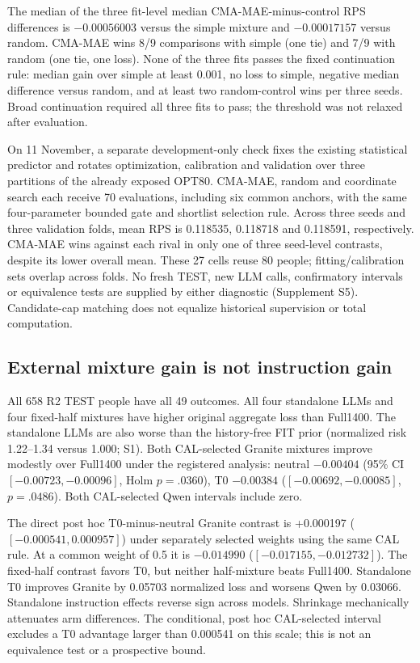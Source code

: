 \documentclass[11pt]{article}
\begin{document}
The median of the three fit-level median CMA-MAE-minus-control RPS
differences is $-0.00056003$ versus the simple mixture and $-0.00017157$
versus random. CMA-MAE wins 8/9 comparisons with simple (one tie) and
7/9 with random (one tie, one loss). None of the three fits passes the
fixed continuation rule: median gain over simple at least 0.001, no loss
to simple, negative median difference versus random, and at least two
random-control wins per three seeds. Broad continuation required all three
fits to pass; the threshold was not relaxed after evaluation.

On 11 November, a separate development-only check fixes the existing
statistical predictor and rotates optimization, calibration and validation
over three partitions of the already exposed OPT80. CMA-MAE, random and
coordinate search each receive 70 evaluations, including six common anchors,
with the same four-parameter bounded gate and shortlist selection rule.
Across three seeds and three validation folds, mean RPS is 0.118535,
0.118718 and 0.118591, respectively. CMA-MAE wins against each rival in
only one of three seed-level contrasts, despite its lower overall mean.
These 27 cells reuse 80 people; fitting/calibration sets overlap across folds.
No fresh TEST, new LLM calls, confirmatory intervals or equivalence tests
are supplied by either diagnostic (Supplement S5). Candidate-cap matching
does not equalize historical supervision or total computation.

\subsection{External mixture gain is not instruction gain}
All 658 R2 TEST people have all 49 outcomes. All four standalone LLMs and four fixed-half mixtures have higher original aggregate loss than Full1400. The standalone LLMs are also worse than the history-free FIT prior (normalized risk 1.22--1.34 versus 1.000; S1). Both CAL-selected Granite mixtures improve modestly over Full1400 under the registered analysis: neutral $-0.00404$ (95\% CI $[-0.00723,-0.00096]$, Holm $p=.0360$), T0 $-0.00384$ ($[-0.00692,-0.00085]$, $p=.0486$). Both CAL-selected Qwen intervals include zero.

The direct post hoc T0-minus-neutral Granite contrast is +0.000197 ($[-0.000541,0.000957]$) under separately selected weights using the same CAL rule. At a common weight of 0.5 it is $-0.014990$ ($[-0.017155,-0.012732]$). The fixed-half contrast favors T0, but neither half-mixture beats Full1400. Standalone T0 improves Granite by 0.05703 normalized loss and worsens Qwen by 0.03066. Standalone instruction effects reverse sign across models. Shrinkage mechanically attenuates arm differences. The conditional, post hoc CAL-selected interval excludes a T0 advantage larger than 0.000541 on this scale; this is not an equivalence test or a prospective bound.
\end{document}
